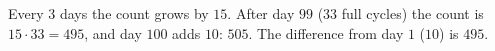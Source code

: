 Every $3$ days the count grows by $15$. After day $99$ (33 full cycles) the count is $15\cdot33=495$, and day $100$ adds $10$: $505$. The difference from day $1$ ($10$) is $\boxed{495}$.
